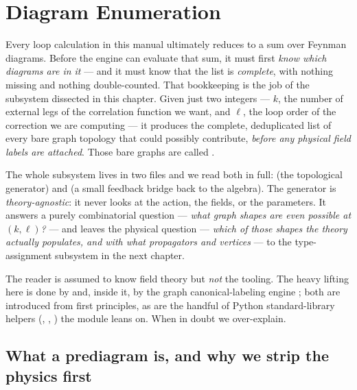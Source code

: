\chapter{Diagram Enumeration}\label{ch:enumeration}

Every loop calculation in this manual ultimately reduces to a sum over Feynman
diagrams. Before the engine can evaluate that sum, it must first \emph{know which
diagrams are in it} --- and it must know that the list is \emph{complete}, with
nothing missing and nothing double-counted. That bookkeeping is the job of the
subsystem dissected in this chapter. Given just two integers --- $k$, the number
of external legs of the correlation function we want, and $\ell$, the loop order
of the correction we are computing --- it produces the complete, deduplicated
list of every bare graph topology that could possibly contribute, \emph{before
any physical field labels are attached}. Those bare graphs are called
.

The whole subsystem lives in two files and we read both in full:
 (the topological
generator) and  (a small feedback bridge
back to the algebra). The generator is \emph{theory-agnostic}: it never looks at
the action, the fields, or the parameters. It answers a purely combinatorial
question --- \emph{what graph shapes are even possible at $(k,\ell)$?} --- and
leaves the physical question --- \emph{which of those shapes the theory actually
populates, and with what propagators and vertices} --- to the type-assignment
subsystem in the next chapter.

The reader is assumed to know \msrjd{} field theory but \emph{not} the tooling.
The heavy lifting here is done by  and, inside it, by the graph
canonical-labeling engine ; both are introduced from first
principles, as are the handful of Python standard-library helpers
(, , ) the module
leans on. When in doubt we over-explain.

\section{What a prediagram is, and why we strip the physics first}

